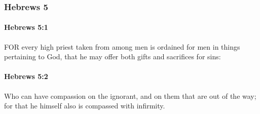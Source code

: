 	\subsubsection{Hebrews 5} %
		\label{HEBREWS-5}
		
		\paragraph{Hebrews 5:1} %
			\label{HEBREWS-5-1}

			FOR every high priest taken from among men is ordained for men in things pertaining to God, that he may offer both gifts and sacrifices for sins:

			\begin{framed}
			\scriptsize
				\begin{compactdesc}
					\item[SBLG] 
				\end{compactdesc}
			\end{framed}

		\paragraph{Hebrews 5:2} %
			\label{HEBREWS-5-2}

			Who can have compassion on the ignorant, and on them that are out of the way; for that he himself also is compassed with infirmity.

